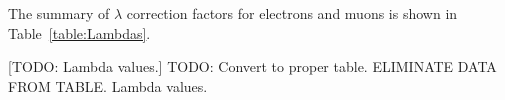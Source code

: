The summary of $\lambda$ correction factors for electrons and muons is shown in Table~\ref{table:Lambdas}.
\begin{multiFigure}
    \centering
    [TODO: Lambda values.]
    {TODO: Convert to proper table. ELIMINATE DATA FROM TABLE. Lambda values.}
    \label{table:Lambdas}
\end{multiFigure}
